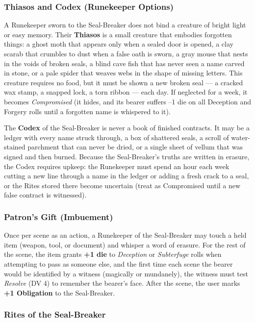 \subsubsection*{Thiasos and Codex (Runekeeper Options)}

A Runekeeper sworn to the Seal-Breaker does not bind a creature of bright light or easy memory. Their \textbf{Thiasos} is a small creature that embodies forgotten things: a ghost moth that appears only when a sealed door is opened, a clay scarab that crumbles to dust when a false oath is sworn, a gray mouse that nests in the voids of broken seals, a blind cave fish that has never seen a name carved in stone, or a pale spider that weaves webs in the shape of missing letters. This creature requires no food, but it must be shown a new broken seal --- a cracked wax stamp, a snapped lock, a torn ribbon --- each day. If neglected for a week, it becomes \textit{Compromised} (it hides, and its bearer suffers --1 die on all Deception and Forgery rolls until a forgotten name is whispered to it).

The \textbf{Codex} of the Seal-Breaker is never a book of finished contracts. It may be a ledger with every name struck through, a box of shattered seals, a scroll of water-stained parchment that can never be dried, or a single sheet of vellum that was signed and then burned. Because the Seal-Breaker's truths are written in erasure, the Codex requires upkeep: the Runekeeper must spend an hour each week cutting a new line through a name in the ledger or adding a fresh crack to a seal, or the Rites stored there become uncertain (treat as Compromised until a new false contract is witnessed).

\subsubsection*{Patron's Gift (Imbuement)}

Once per scene as an action, a Runekeeper of the Seal-Breaker may touch a held item (weapon, tool, or document) and whisper a word of erasure. For the rest of the scene, the item grants \textbf{+1 die} to \textit{Deception} or \textit{Subterfuge} rolls when attempting to pass as someone else, and the first time each scene the bearer would be identified by a witness (magically or mundanely), the witness must test \textit{Resolve} (DV 4) to remember the bearer's face. After the scene, the user marks \textbf{+1 Obligation} to the Seal-Breaker.

\subsubsection*{Rites of the Seal-Breaker}

